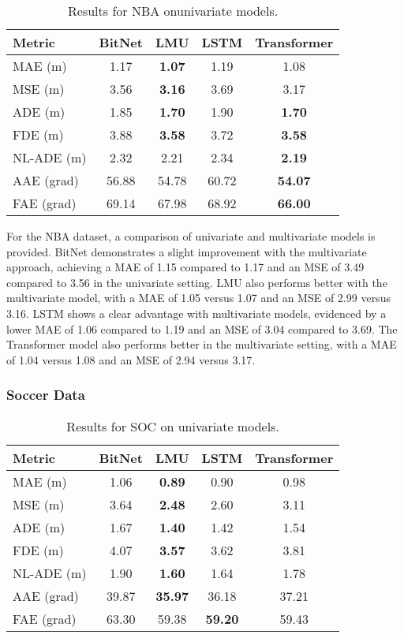 \begin{table}[H]
\centering
\caption{Results for NBA onunivariate models.}
\label{uni:NBA}
\begin{tabular}{l||c|c|c|c}
Metric & BitNet & LMU & LSTM & Transformer \\
\hline\hline
MAE (m) & 1.17 & \textbf{1.07} & 1.19 & 1.08 \\
MSE (m) & 3.56 & \textbf{3.16} & 3.69 & 3.17 \\
ADE (m) & 1.85 & \textbf{1.70} & 1.90 & \textbf{1.70} \\
FDE (m) & 3.88 & \textbf{3.58} & 3.72 & \textbf{3.58} \\
NL-ADE (m) & 2.32 & 2.21 & 2.34 & \textbf{2.19} \\
AAE (grad) & 56.88 & 54.78 & 60.72 & \textbf{54.07} \\
FAE (grad) & 69.14 & 67.98 & 68.92 & \textbf{66.00} \\
\end{tabular}
\end{table}

For the NBA dataset, a comparison of univariate and multivariate models is provided. BitNet demonstrates a slight improvement with the multivariate approach, achieving a MAE of 1.15 compared to 1.17 and an MSE of 3.49 compared to 3.56 in the univariate setting. LMU also performs better with the multivariate model, with a MAE of 1.05 versus 1.07 and an MSE of 2.99 versus 3.16. LSTM shows a clear advantage with multivariate models, evidenced by a lower MAE of 1.06 compared to 1.19 and an MSE of 3.04 compared to 3.69. The Transformer model also performs better in the multivariate setting, with a MAE of 1.04 versus 1.08 and an MSE of 2.94 versus 3.17.

\subsubsection{Soccer Data}

\begin{table}[H]
\centering
\caption{Results for SOC on univariate models.}
\label{uni:SOC}
\begin{tabular}{l||c|c|c|c}
Metric & BitNet & LMU & LSTM & Transformer \\
\hline\hline
MAE (m) & 1.06 & \textbf{0.89} & 0.90 & 0.98 \\
MSE (m) & 3.64 & \textbf{2.48} & 2.60 & 3.11 \\
ADE (m) & 1.67 & \textbf{1.40} & 1.42 & 1.54 \\
FDE (m) & 4.07 & \textbf{3.57} & 3.62 & 3.81 \\
NL-ADE (m) & 1.90 & \textbf{1.60} & 1.64 & 1.78 \\
AAE (grad) & 39.87 & \textbf{35.97} & 36.18 & 37.21 \\
FAE (grad) & 63.30 & 59.38 & \textbf{59.20} & 59.43 \\
\end{tabular}
\end{table}

